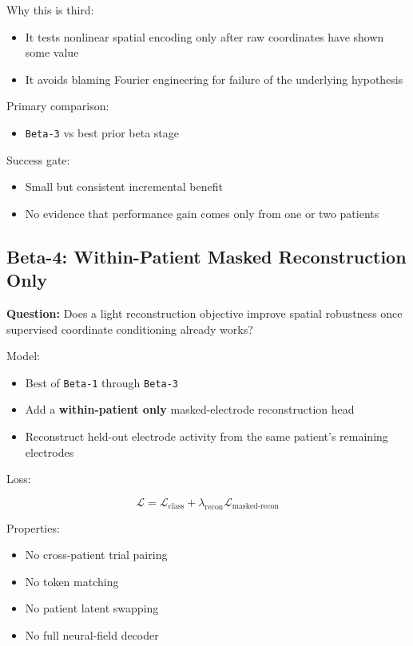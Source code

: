 \documentclass[
]{article}
\providecommand{\tightlist}{%
  \setlength{\itemsep}{0pt}\setlength{\parskip}{0pt}}
\begin{document}
Why this is third:

\begin{itemize}
\tightlist
\item
  It tests nonlinear spatial encoding only after raw coordinates have
  shown some value
\item
  It avoids blaming Fourier engineering for failure of the underlying
  hypothesis
\end{itemize}

Primary comparison:

\begin{itemize}
\tightlist
\item
  \texttt{Beta-3} vs best prior beta stage
\end{itemize}

Success gate:

\begin{itemize}
\tightlist
\item
  Small but consistent incremental benefit
\item
  No evidence that performance gain comes only from one or two patients
\end{itemize}

\subsection{Beta-4: Within-Patient Masked Reconstruction
Only}\label{beta-4-within-patient-masked-reconstruction-only}

\textbf{Question:} Does a light reconstruction objective improve spatial
robustness once supervised coordinate conditioning already works?

Model:

\begin{itemize}
\tightlist
\item
  Best of \texttt{Beta-1} through \texttt{Beta-3}
\item
  Add a \textbf{within-patient only} masked-electrode reconstruction
  head
\item
  Reconstruct held-out electrode activity from the same patient's
  remaining electrodes
\end{itemize}

Loss:

\[
\mathcal{L} = \mathcal{L}_{\text{class}} + \lambda_{\text{recon}} \mathcal{L}_{\text{masked-recon}}
\]

Properties:

\begin{itemize}
\tightlist
\item
  No cross-patient trial pairing
\item
  No token matching
\item
  No patient latent swapping
\item
  No full neural-field decoder
\end{itemize}
\end{document}
